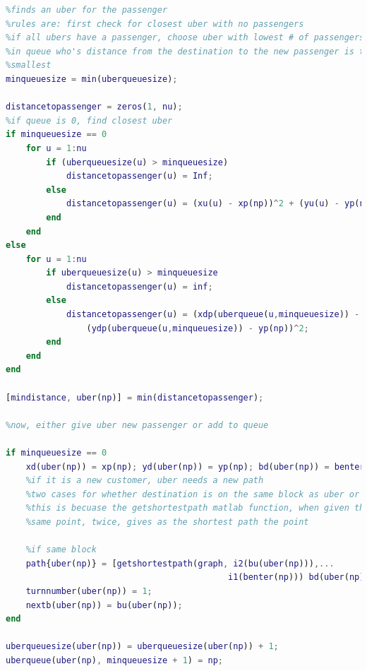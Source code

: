 \documentclass{article}
\begin{document}
\begin{lstlisting}[language = matlab]
%finduber.m
%finds an uber for the passenger
%rules are: first check for closest uber with no passengers
%if all ubers have a passenger, choose uber with lowest # of passengers
%in queue who's distance from the destination to the new passenger is the
%smallest
minqueuesize = min(uberqueuesize);

distancetopassenger = zeros(1, nu);
%if queue is 0, find closest uber
if minqueuesize == 0
    for u = 1:nu
        if (uberqueuesize(u) > minqueuesize)
            distancetopassenger(u) = Inf;
        else
            distancetopassenger(u) = (xu(u) - xp(np))^2 + (yu(u) - yp(np))^2;
        end
    end
else
    for u = 1:nu
        if uberqueuesize(u) > minqueuesize
            distancetopassenger(u) = inf;
        else
            distancetopassenger(u) = (xdp(uberqueue(u,minqueuesize)) - xp(np))^2 + ...
                (ydp(uberqueue(u,minqueuesize)) - yp(np))^2;
        end 
    end
end

[mindistance, uber(np)] = min(distancetopassenger);

%now, either give uber new passenger or add to queue

if minqueuesize == 0
    xd(uber(np)) = xp(np); yd(uber(np)) = yp(np); bd(uber(np)) = benter(np); pd(uber(np)) = pp(np);
    %if it is a new customer, uber needs a new path
    %two cases for whether destination is on the same block as uber or not
    %this is becuase the getshortestpath matlab function, when given the
    %same point, twice, gives as the shortest path the point
    
    %if same block
    path{uber(np)} = [getshortestpath(graph, i2(bu(uber(np))),... 
                                            i1(benter(np))) bd(uber(np))];
    turnnumber(uber(np)) = 1;
    nextb(uber(np)) = bu(uber(np));
end

uberqueuesize(uber(np)) = uberqueuesize(uber(np)) + 1;
uberqueue(uber(np), minqueuesize + 1) = np;
\end{lstlisting}
\end{document}
